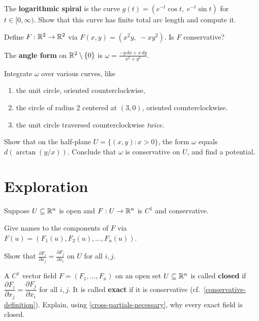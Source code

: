 \documentclass{homework}
\begin{document}
\begin{problem}
  The \textbf{logarithmic spiral} is the curve
  $g(t) = (e^{-t}\cos t,\; e^{-t}\sin t)$ for $t \in [0, \infty)$.
  Show that this curve has finite total arc length and compute it.
\end{problem}

\begin{problem}
  Define $F : \mathbb{R}^2 \to \mathbb{R}^2$ via $F(x,y)=(x^2 y,\;-xy^2)$. Is $F$ conservative?
\end{problem}

\begin{problem}\label{winding-number}%
  The \textbf{angle form} on $\mathbb{R}^2\setminus\{0\}$ is
  \(
    \omega = \displaystyle\frac{-y\,dx+x\,dy}{x^2+y^2}
    \).

    Integrate $\omega$ over various curves, like
\begin{enumerate}
\item[(a)] the unit circle, oriented counterclockwise,
  \item[(b)] the circle of radius $2$ centered at $(3,0)$, oriented counterclockwise.
  \item[(c)] the unit circle traversed counterclockwise \emph{twice}.
  \end{enumerate}
\end{problem}

\begin{problem}
  Show that on the half-plane $U=\{(x,y):x>0\}$, the form $\omega$ equals $d\!\left(\arctan(y/x)\right)$.
  Conclude that $\omega$ is conservative on $U$, and find a potential.
\end{problem}

\section{Exploration}

\begin{problem}\label{cross-partials-necessary}%
  Suppose $U\subseteq\mathbb{R}^n$ is open and $F:U\to\mathbb{R}^n$ is $C^1$ and conservative.

  Give names to the components of $F$ via $F(u) = (F_1(u),F_2(u),\ldots,F_n(u))$.

  Show that
  \(
    \displaystyle\frac{\partial F_i}{\partial x_j}=\frac{\partial F_j}{\partial x_i}\)  on $U$
    for all $i,j$.
\end{problem}

\begin{problem}\label{closed-vs-exact}%
  A $C^1$ vector field $F = (F_1, \ldots, F_n)$ on an open set $U \subseteq \mathbb{R}^n$ is called
  \textbf{closed} if
  $\dfrac{\partial F_i}{\partial x_j} = \dfrac{\partial F_j}{\partial x_i}$ for all $i, j$.
  It is called \textbf{exact} if it is conservative
  (cf.~\ref{conservative-definition}).
  Explain, using \ref{cross-partials-necessary}, why every exact field is closed.
\end{problem}
\end{document}
